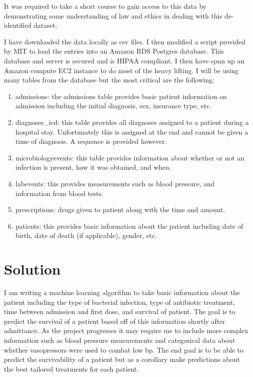 \documentclass[11pt]{article}
\begin{document}
It was required to take a short course to gain access to this data by demonstrating some understanding of law and ethics in dealing with this de-identified dataset.

I have downloaded the data locally as csv files. I then modified a script provided by MIT to load the entries into an Amazon RDS Postgres database. This database and server is secured and is HIPAA compliant. I then have spun up an Amazon compute EC2 instance to do most of the heavy lifting. I will be using many tables from the database but the most critical are the following:
\begin{enumerate}
\item admissions: the admissions table provides basic patient information on admission including the initial diagnosis, sex, insurance type, etc.
\item diagnoses\_icd: this table provides all diagnoses assigned to a patient during a hospital stay. Unfortunately this is assigned at the end and cannot be given a time of diagnosis. A sequence is provided however.
\item microbiologyevents: this table provides information about whether or not an infection is present, how it was obtained, and when.
\item labevents: this provides measurements such as blood pressure, and information from blood tests.
\item prescriptions: drugs given to patient along with the time and amount.
\item patients: this provides basic information about the patient including date of birth, date of death (if applicable), gender, etc.
\end{enumerate}


\section{Solution}
I am writing a machine learning algorithm to take basic information about the patient including the type of bacterial infection, type of antibiotic treatment, time between admission and first dose, and survival of patient. The goal is to predict the survival of a patient based off of this information shortly after admittance. As the project progresses it may require me to include more complex information such as blood pressure measurements and categorical data about whether vasopressors were used to combat low bp. 
The end goal is to be able to predict the survivability of a patient but as a corollary make predictions about the best tailored treatments for each patient. 
\end{document}
